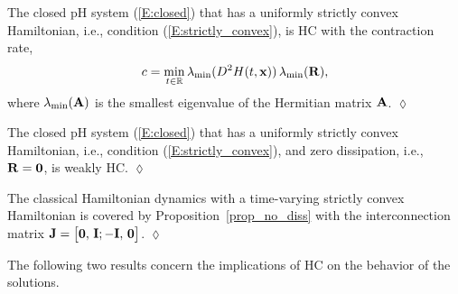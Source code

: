 \begin{proposition} \label{prop_main}
The closed pH system (\ref{E:closed}) that has a uniformly strictly convex Hamiltonian, i.e., condition (\ref{E:strictly_convex}), 
is HC with the contraction rate, 
\begin{equation*}
    c = \min_{t \in \mathbb{R}} \lambda_{\min}(D^2 H(t, \mathbf{x}))\, \lambda_{\min}(\mathbf{R}),
\end{equation*}
where $\lambda_{\min}(\mathbf{A})$ is the smallest eigenvalue of the Hermitian matrix $\mathbf{A}$. \hfill $\lozenge$
\end{proposition}

\begin{proposition}[Weak Horizontal Contraction with $\matr R = \matr 0$] \label{prop_no_diss}
The closed pH system (\ref{E:closed}) that has a uniformly strictly convex Hamiltonian, i.e., condition (\ref{E:strictly_convex}), and zero dissipation, i.e., $\matr R = \matr 0$, is weakly HC. \hfill $\lozenge$
\end{proposition}

\begin{remark}
The classical Hamiltonian dynamics with a time-varying strictly convex Hamiltonian is covered by Proposition~\ref{prop_no_diss} with the interconnection matrix $\mathbf{J} = \big[\mathbf{0},\, \mathbf{I}; -\mathbf{I},\, \mathbf{0} \big]$. \hfill $\lozenge$
\end{remark}

The following two results concern the implications of HC on the behavior of the solutions.


